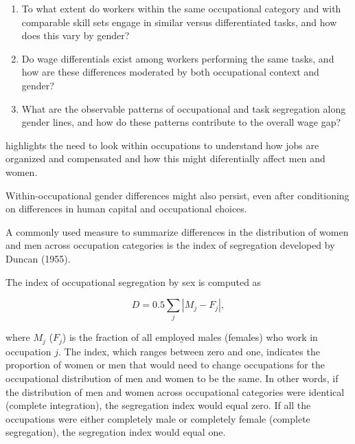 

\begin{enumerate}
\item To what extent do workers within the same occupational category and with comparable skill sets engage in similar versus differentiated tasks, and how does this vary by gender?
\item Do wage differentials exist among workers performing the same tasks, and how are these differences moderated by both occupational context and gender?
\item What are the observable patterns of occupational and task segregation along gender lines, and how do these patterns contribute to the overall wage gap?
\end{enumerate}


\textcite{goldinGrandGenderConvergence2014a} highlights the need to look within occupations
to understand how jobs are organized and compensated and how this might diferentially affect men and
women. 

Within-occupational gender differences might also
persist, even after conditioning on differences in human capital and occupational choices. \textcite{cortes2018occupation}

A commonly used measure to summarize differences in the distribution of women and men across occupation categories 
is the index of segregation developed by Duncan (1955). 



The index of occupational segregation by sex is computed as

\begin{equation}
    D = 0.5 \sum_j |M_j - F_j|,
\end{equation}

where $M_j$ ($F_j$) is the fraction of all employed males (females) who work in occupation $j$. 
The index, which ranges between zero and one, indicates the proportion of women or men that would need 
to change occupations for the occupational distribution of men and women to be the same. In other words, 
if the distribution of men and women across occupational categories were identical (complete integration), 
the segregation index would equal zero. If all the occupations were either completely male or completely female 
(complete segregation), the segregation index would equal one.

